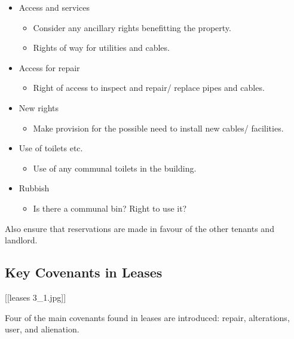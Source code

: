 \documentclass[
]{article}
\providecommand{\tightlist}{%
  \setlength{\itemsep}{0pt}\setlength{\parskip}{0pt}}
\begin{document}
\begin{itemize}
\tightlist
\item
  Access and services

  \begin{itemize}
  \tightlist
  \item
    Consider any ancillary rights benefitting the property.
  \item
    Rights of way for utilities and cables.
  \end{itemize}
\item
  Access for repair

  \begin{itemize}
  \tightlist
  \item
    Right of access to inspect and repair/ replace pipes and cables.
  \end{itemize}
\item
  New rights

  \begin{itemize}
  \tightlist
  \item
    Make provision for the possible need to install new cables/
    facilities.
  \end{itemize}
\item
  Use of toilets etc.

  \begin{itemize}
  \tightlist
  \item
    Use of any communal toilets in the building.
  \end{itemize}
\item
  Rubbish

  \begin{itemize}
  \tightlist
  \item
    Is there a communal bin? Right to use it?
  \end{itemize}
\end{itemize}

Also ensure that reservations are made in favour of the other tenants
and landlord.

\hypertarget{key-covenants-in-leases}{%
\subsection{Key Covenants in Leases}\label{key-covenants-in-leases}}

{[}{[}leases 3\_1.jpg{]}{]}

Four of the main covenants found in leases are introduced: repair,
alterations, user, and alienation.
\end{document}
